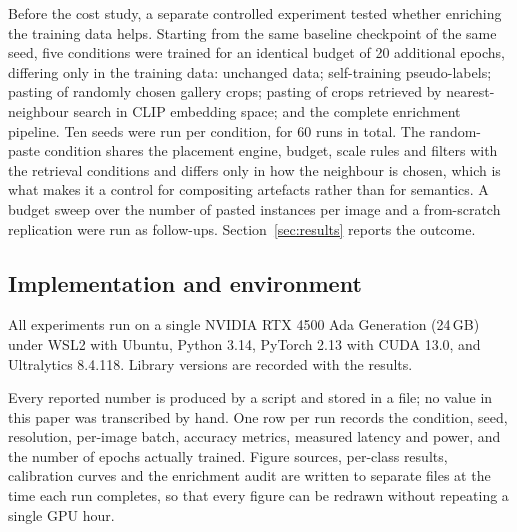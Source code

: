 Before the cost study, a separate controlled experiment tested whether enriching the
training data helps. Starting from the same baseline checkpoint of the same seed, five
conditions were trained for an identical budget of 20 additional epochs, differing only in
the training data: unchanged data; self-training pseudo-labels; pasting of randomly chosen
gallery crops; pasting of crops retrieved by nearest-neighbour search in CLIP embedding
space; and the complete enrichment pipeline. Ten seeds were run per condition, for 60 runs
in total. The random-paste condition shares the placement engine, budget, scale rules and
filters with the retrieval conditions and differs only in how the neighbour is chosen,
which is what makes it a control for compositing artefacts rather than for semantics.
A budget sweep over the number of pasted instances per image and a from-scratch replication
were run as follow-ups. Section~\ref{sec:results} reports the outcome.

\subsection{Implementation and environment}
\label{sec:setup:env}

All experiments run on a single NVIDIA RTX 4500 Ada Generation (24\,GB) under WSL2 with
Ubuntu, Python 3.14, PyTorch 2.13 with CUDA 13.0, and Ultralytics 8.4.118. Library versions
are recorded with the results.

Every reported number is produced by a script and stored in a file; no value in this paper
was transcribed by hand. One row per run records the condition, seed, resolution,
per-image batch, accuracy metrics, measured latency and power, and the number of epochs
actually trained. Figure sources, per-class results, calibration curves and the
enrichment audit are written to separate files at the time each run completes, so that
every figure can be redrawn without repeating a single GPU hour.
